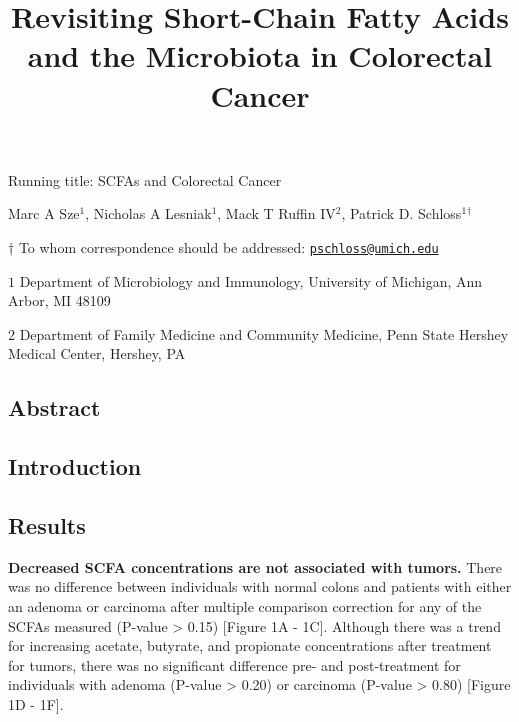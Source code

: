 \documentclass[11pt,]{article}
\title{Revisiting Short-Chain Fatty Acids and the Microbiota in Colorectal
Cancer}
\author{}
\date{}
\begin{document}
\maketitle

\vspace{35mm}

Running title: SCFAs and Colorectal Cancer

\vspace{35mm}

Marc A Sze\({^1}\), Nicholas A Lesniak\({^1}\), Mack T Ruffin
IV\({^2}\), Patrick D. Schloss\({^1}\)\({^\dagger}\)

\vspace{40mm}

\(\dagger\) To whom correspondence should be addressed:
\href{mailto:pschloss@umich.edu}{\nolinkurl{pschloss@umich.edu}}

\(1\) Department of Microbiology and Immunology, University of Michigan,
Ann Arbor, MI 48109

\(2\) Department of Family Medicine and Community Medicine, Penn State
Hershey Medical Center, Hershey, PA

\newpage

\linenumbers

\subsection{Abstract}\label{abstract}

\newpage

\subsection{Introduction}\label{introduction}

\newpage

\subsection{Results}\label{results}

\textbf{Decreased SCFA concentrations are not associated with tumors.}
There was no difference between individuals with normal colons and
patients with either an adenoma or carcinoma after multiple comparison
correction for any of the SCFAs measured (P-value \textgreater{} 0.15)
{[}Figure 1A - 1C{]}. Although there was a trend for increasing acetate,
butyrate, and propionate concentrations after treatment for tumors,
there was no significant difference pre- and post-treatment for
individuals with adenoma (P-value \textgreater{} 0.20) or carcinoma
(P-value \textgreater{} 0.80) {[}Figure 1D - 1F{]}.
\end{document}
